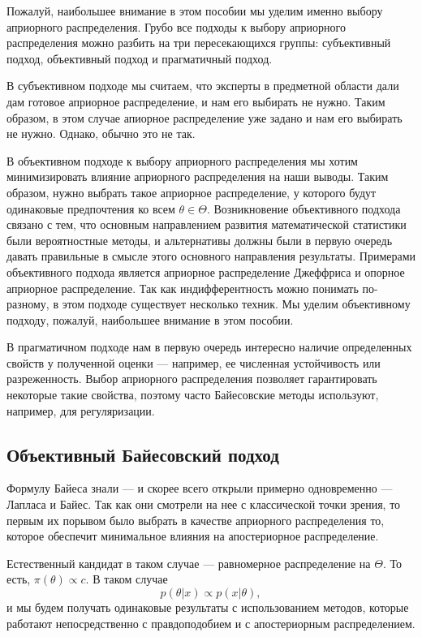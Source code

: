 Пожалуй, наибольшее внимание в этом пособии мы уделим именно выбору априорного распределения.
Грубо все подходы к выбору априорного распределения можно разбить на три пересекающихся группы:
субъективный подход, объективный подход и прагматичный подход.

В субъективном подходе мы считаем, что эксперты в предметной области дали дам готовое априорное распределение, и нам его выбирать не нужно.
Таким образом, в этом случае апиорное распределение уже задано и нам его выбирать не нужно.
Однако, обычно это не так.

В объективном подходе к выбору априорного распределения мы хотим минимизировать влияние априорного распределения
на наши выводы.
Таким образом, нужно выбрать такое априорное распределение, у которого будут одинаковые предпочтения ко всем $\theta \in \Theta$.
Возникновение объективного подхода связано с тем, что основным направлением развития математической статистики 
были вероятностные методы, и альтернативы должны были в первую очередь давать правильные в смысле этого основного направления результаты.
Примерами объективного подхода является априорное распределение Джеффриса и опорное априорное распределение.
Так как индифферентность можно понимать по-разному, в этом подходе существует несколько техник.
Мы уделим объективному подходу, пожалуй, наибольшее внимание в этом пособии.

В прагматичном подходе нам в первую очередь интересно наличие определенных свойств у полученной оценки --- 
например, ее численная устойчивость или разреженность.
Выбор априорного распределения позволяет гарантировать некоторые такие свойства,
поэтому часто Байесовские методы используют, например, для регуляризации.

\subsection{Объективный Байесовский подход}
\label{sec:objective_intro}

Формулу Байеса знали --- и скорее всего открыли примерно одновременно --- Лапласа и Байес. 
Так как они смотрели на нее с классической точки зрения,
то первым их порывом было выбрать в качестве априорного распределения то, 
которое обеспечит минимальное влияния на апостериорное распределение.

Естественный кандидат в таком случае --- равномерное распределение на $\Theta$.
То есть, $\pi(\theta) \propto c$.
В таком случае 
\[
p(\theta | x) \propto p(x | \theta),
\]
и мы будем получать одинаковые результаты с использованием методов, которые работают непосредственно с правдоподобием и с апостериорным распределением.

